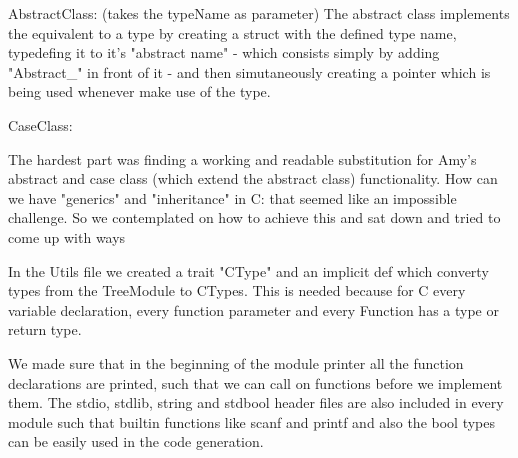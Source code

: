 AbstractClass: (takes the typeName as parameter)
The abstract class implements the equivalent to a type by creating a struct with the defined type name, typedefing it to
it's "abstract name" - which consists simply by adding "Abstract_" in front of it - and then simutaneously creating a pointer
which is being used whenever make use of the type.

CaseClass:

The hardest part was finding a working and readable substitution for Amy's abstract and case class (which extend the abstract class) functionality.
How can we have "generics" and "inheritance" in C: that seemed like an impossible challenge.
So we contemplated on how to achieve this and sat down and tried to come up with ways

In the Utils file we created a trait "CType" and an implicit def which converty types from the TreeModule to CTypes.
This is needed because for C every variable declaration, every function parameter and every Function has a type or return type.

We made sure that in the beginning of the module printer all the function declarations are printed, such that we can call on functions before we implement them.
The stdio, stdlib, string and stdbool header files are also included in every module such that builtin functions like scanf and printf and also the bool types can be easily used in the code generation.
